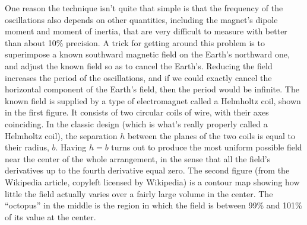 One reason the technique isn't quite that simple is that the frequency of
the oscillations also depends on other quantities,
including the magnet's dipole moment and moment of
inertia, that are very difficult
to measure with better than about 10\% precision. A trick for
getting around this problem is to superimpose a known southward magnetic field
on the Earth's northward one, and adjust the known field so as to cancel the Earth's.
Reducing the field increases the period of the oscillations, and
if we could exactly cancel the horizontal component of the Earth's field,
then the period would be infinite. The known field is supplied by a type
of electromagnet called a Helmholtz coil, shown in the first figure. It consists of
two circular coils of wire, with their axes coinciding. In the classic design
(which is what's really properly called a Helmholtz coil), the separation $h$
between the planes of the two coils is equal to their radius, $b$. Having $h=b$
turns out to produce the most uniform possible field near the center of the whole
arrangement, in the sense that all the field's derivatives up to the fourth
derivative equal zero. The second figure (from the Wikipedia article, copyleft
licensed by Wikipedia) is a contour map showing how little
the field actually varies over a fairly large volume in the center. The ``octopus'' in
the middle is the region in which the field is between 99\% and 101\% of its value at the
center.

